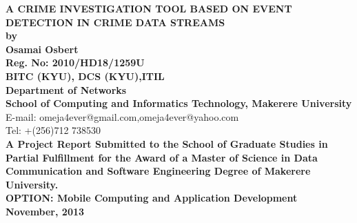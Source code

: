 
\begin{center}
{\bf \Large A CRIME INVESTIGATION TOOL BASED ON EVENT DETECTION IN CRIME DATA STREAMS\newline }\vspace{4cm} \\
 {\bf by}\\ {\bf Osamai Osbert  }\\
{\bf Reg. No: 2010/HD18/1259U}\\
{\bf BITC (KYU), DCS (KYU),ITIL}
 \\
{\bf Department of Networks}\\
{\bf School of Computing and Informatics Technology, Makerere University}\\ E-mail: omeja4ever@gmail.com,omeja4ever@yahoo.com \\Tel: +(256)712 738530
\vspace{5cm}\\

{\bf A Project Report Submitted to the School of Graduate Studies in Partial Fulfillment for the Award of a Master of Science in Data Communication and Software Engineering Degree of Makerere University.}\\ 
{\bf OPTION: Mobile Computing and Application Development}
\vspace{2cm}\\

{\bf November, 2013 }
\end{center}


\makeatletter
    \def\thebibliography#1{\section*{References\@mkboth
      {REFERENCES}{REFERENCES}}\list
      {[\arabic{enumi}]}{\settowidth\labelwidth{[#1]}\leftmargin\labelwidth
	\advance\leftmargin\labelsep
	\usecounter{enumi}}
	\def\newblock{\hskip .11em plus .33em minus .07em}
	\sloppy\clubpenalty4000\widowpenalty4000
	\sfcode`\.=1000\relax}
    \makeatother
\newtheorem{defn}{Definition}[section]
\newcommand{\ud}{\underline}
\newcommand{\vs}{{\vspace{4.6mm}}}
\pagestyle{empty}
\linespread{2}
